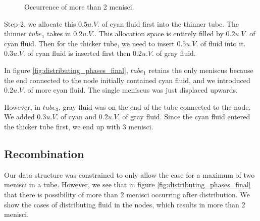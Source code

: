 \documentclass{crm-article}
\begin{document}
		\begin{figure}[H]
			\centering
			\caption{Occurrence of more than 2 menisci.}
		\end{figure}
		
		Step-2, we allocate this $0.5 u.V.$ of cyan fluid first into the thinner tube. The thinner ${tube}_1$ takes in $0.2 u.V.$. This allocation space is entirely filled by $0.2 u.V.$ of cyan fluid. Then for the thicker tube, we need to insert $0.5 u.V.$ of fluid into it. $0.3 u.V.$ of cyan fluid is inserted first then $0.2 u.V.$ of gray fluid.
				
		In figure \ref{fig:distributing_phases_final}, ${tube}_1$ retains the only meniscus because the end connected to the node initially contained cyan fluid, and we introduced $0.2 u.V.$ of more cyan fluid. The single meniscus was just displaced upwards.
		
		However, in ${tube}_3$, gray fluid was on the end of the tube connected to the node. We added $0.3 u.V.$ of cyan and $0.2 u.V.$ of gray fluid. Since the cyan fluid entered the thicker tube first, we end up with 3 menisci.	

	\subsection{Recombination} \label{sec:recombination-details}
		Our data structure was constrained to only allow the case for a maximum of two menisci in a tube. However, we see that in figure \ref{fig:distributing_phases_final} that there is possibility of more than 2 menisci occurring after distribution. We show the cases of distributing fluid in the nodes, which results in more than 2 menisci.
		
\end{document}
